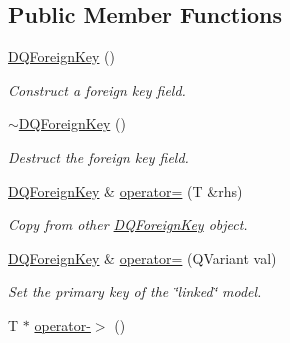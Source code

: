 \subsection*{Public Member Functions}
\begin{DoxyCompactItemize}
\item 
\hypertarget{classDQForeignKey_a08d0db06b02c4db1deec84200c117602}{
\hyperlink{classDQForeignKey_a08d0db06b02c4db1deec84200c117602}{DQForeignKey} ()}
\label{classDQForeignKey_a08d0db06b02c4db1deec84200c117602}

\begin{DoxyCompactList}\small\item\em Construct a foreign key field. \item\end{DoxyCompactList}\item 
\hypertarget{classDQForeignKey_a9ea90a97cc730abfc7bfe233a7b438eb}{
\hyperlink{classDQForeignKey_a9ea90a97cc730abfc7bfe233a7b438eb}{$\sim$DQForeignKey} ()}
\label{classDQForeignKey_a9ea90a97cc730abfc7bfe233a7b438eb}

\begin{DoxyCompactList}\small\item\em Destruct the foreign key field. \item\end{DoxyCompactList}\item 
\hyperlink{classDQForeignKey}{DQForeignKey} \& \hyperlink{classDQForeignKey_ad2a85ec7abeb654bed3a385743535cc2}{operator=} (T \&rhs)
\begin{DoxyCompactList}\small\item\em Copy from other \hyperlink{classDQForeignKey}{DQForeignKey} object. \item\end{DoxyCompactList}\item 
\hypertarget{classDQForeignKey_ae91635a7ab1bafd2a42915504f59e0eb}{
\hyperlink{classDQForeignKey}{DQForeignKey} \& \hyperlink{classDQForeignKey_ae91635a7ab1bafd2a42915504f59e0eb}{operator=} (QVariant val)}
\label{classDQForeignKey_ae91635a7ab1bafd2a42915504f59e0eb}

\begin{DoxyCompactList}\small\item\em Set the primary key of the \char`\"{}linked\char`\"{} model. \item\end{DoxyCompactList}\item 
\hypertarget{classDQForeignKey_a96261988ee2eb9e8cebd6ec415ee5e0f}{
T $\ast$ \hyperlink{classDQForeignKey_a96261988ee2eb9e8cebd6ec415ee5e0f}{operator-\/$>$} ()}
\label{classDQForeignKey_a96261988ee2eb9e8cebd6ec415ee5e0f}


\end{DoxyCompactItemize}
